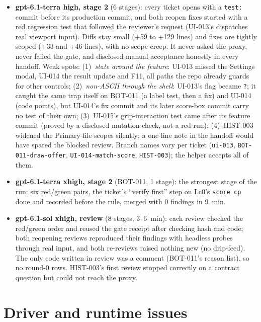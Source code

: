 \documentclass[11pt,a4paper]{article}
\begin{document}
\begin{itemize}
  \item \textbf{gpt-6.1-terra high, stage 2} (6 stages): every ticket opens with a
        \texttt{test:} commit before its production commit, and both reopen fixes started
        with a red regression test that followed the reviewer's request (UI-013's dispatches
        real viewport input). Diffs stay small (+59 to +129 lines) and fixes are tightly
        scoped (+33 and +46 lines), with no scope creep. It never asked the proxy, never failed
        the gate, and disclosed manual acceptance honestly in every handoff. Weak spots:
        (1)~\emph{state around the feature}: UI-013 missed the Settings modal, UI-014 the
        result update and F11, all paths the repo already guards for other controls;
        (2)~\emph{non-ASCII through the shell}: UI-013's flag became \texttt{?}; it caught the
        same trap itself on BOT-011 (a label test, then a fix) and UI-014 (code points), but
        UI-014's fix commit and its later score-box commit carry no test of their own;
        (3)~UI-015's grip-interaction test came after its feature commit (proved by a disclosed
        mutation check, not a red run); (4)~HIST-003 widened the Primary-file scopes silently;
        a one-line note in the handoff would have spared the blocked review. Branch names
        vary per ticket (\texttt{ui-013}, \texttt{BOT-011-draw-offer},
        \texttt{UI-014-match-score}, \texttt{HIST-003}); the helper accepts all of them.
  \item \textbf{gpt-6.1-terra xhigh, stage 2} (BOT-011, 1 stage): the strongest stage of the
        run: six red/green pairs, the ticket's ``verify first'' step on Lc0's \texttt{score cp}
        done and recorded before the rule, merged with 0 findings in 9~min.
  \item \textbf{gpt-6.1-sol xhigh, review} (8 stages, 3--6~min): each review checked the
        red/green order and reused the gate receipt after checking hash and code; both
        reopening reviews reproduced their findings with headless probes through real input,
        and both re-reviews raised nothing new (no drip-feed). The only code written in review
        was a comment (BOT-011's reason list), so no round-0 rows. HIST-003's first review
        stopped correctly on a contract question but could not reach the proxy.
\end{itemize}

\section*{Driver and runtime issues}
\end{document}

